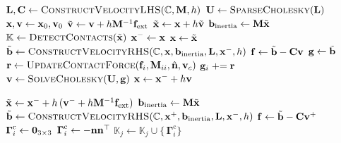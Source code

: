 \begin{algorithm}[H]
\caption{Velocity-based PD mass-spring simulation loop with frictionless contact.}
\label{alg:PD_velocity_full}
\begin{algorithmic}[1]
\addtolength{\itemsep}{0.5ex}
    \State $\mathbf{L}, \mathbf{C} \gets \textsc{ConstructVelocityLHS}(\mathbb{C}, \mathbf{M}, h)$
    \State $\mathbf{U} \gets \textsc{SparseCholesky}(\mathbf{L})$
    \State $\mathbf{x}, \mathbf{v} \gets \mathbf{x}_0, \mathbf{v}_0$
        \State $\tilde{\mathbf{v}} \gets \mathbf{v} + h\mathbf{M}^{-1}\mathbf{f}_{\text{ext}}$
        \State $\tilde{\mathbf{x}} \gets \mathbf{x} + h\tilde{\mathbf{v}}$
        \State $\mathbf{b}_{\text{inertia}} \gets \mathbf{M}\tilde{\mathbf{x}}$
        \State $\mathbb{K} \gets \textsc{DetectContacts}(\tilde{\mathbf{x}})$
        \State $\mathbf{x}^- \gets \mathbf{x}$
        \State $\mathbf{x} \gets \tilde{\mathbf{x}}$
            \State $\tilde{\mathbf{b}} \gets \textsc{ConstructVelocityRHS}(\mathbb{C}, \mathbf{x}, \mathbf{b}_{\text{inertia}}, \mathbf{L}, \mathbf{x}^-, h)$
            \State $\mathbf{f} \gets \tilde{\mathbf{b}} - \mathbf{C}\mathbf{v}$
            \State $\mathbf{g} \gets \tilde{\mathbf{b}}$
                \State $\mathbf{r} \gets \textsc{UpdateContactForce}(\mathbf{f}_{i}, \mathbf{M}_{ii}, \hat{\mathbf{n}}, \mathbf{v}_c)$
                \State $\mathbf{g}_{i} \mathrel{+}= \mathbf{r}$
            \EndFor
            \State $\mathbf{v} \gets \textsc{SolveCholesky}(\mathbf{U}, \mathbf{g})$
            \State $\mathbf{x} \gets \mathbf{x}^- + h\mathbf{v}$
        \EndFor
    \EndWhile
\EndFunction
\end{algorithmic}
\end{algorithm}

\newpage


\begin{algorithm}[H]
\caption{Precompute local Jacobian factors for the contact term in the backward pass.}
\label{alg:PD_contact_precompute_local_derivative}
\begin{algorithmic}[1]
\addtolength{\itemsep}{0.5ex}
    \State $\tilde{\mathbf{x}} \gets \mathbf{x}^- + h\,(\mathbf{v}^- + h\mathbf{M}^{-1}\mathbf{f}_{\text{ext}})$
    \State $\mathbf{b}_{\text{inertia}} \gets \mathbf{M}\tilde{\mathbf{x}}$
    \State $\tilde{\mathbf{b}} \gets \textsc{ConstructVelocityRHS}(\mathbb{C}, \mathbf{x}^+, \mathbf{b}_{\text{inertia}}, \mathbf{L}, \mathbf{x}^-, h)$
    \State $\mathbf{f} \gets \tilde{\mathbf{b}} - \mathbf{C}\mathbf{v}^+$
            \State $\boldsymbol{\Gamma}^{\text{c}}_i \gets \mathbf{0}_{3\times 3}$
        \Else
            \State $\boldsymbol{\Gamma}^{\text{c}}_i \gets -\mathbf{n}\mathbf{n}^\top$
        \EndIf
    \State $\mathbb{K}_j \gets \mathbb{K}_j \cup \{\,\boldsymbol{\Gamma}^{\text{c}}_i\}$
    \EndFor
\EndFunction
\end{algorithmic}
\end{algorithm}

